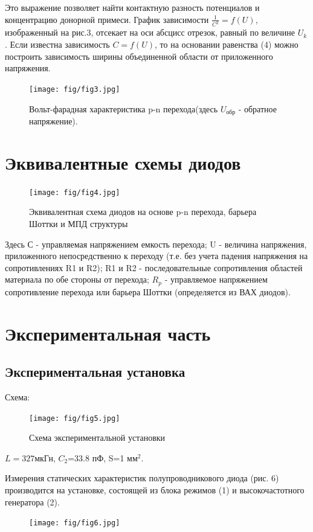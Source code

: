 Это выражение позволяет найти контактную разность потенциалов и концентрацию донорной примеси. График зависимости $\frac{1}{C^2}=f(U)$, изображенный на рис.3, отсекает на оси абсцисс отрезок, равный по величине $U_k$. Если известна зависимость $C=f(U)$, то на основании равенства (4) можно построить зависимость ширины объединенной области от приложенного напряжения.
\begin{figure}[h!]
	\centering
	\texttt{[image: fig/fig3.jpg]}
	\caption{Вольт-фарадная характеристика p-n перехода(здесь $U_{\text{обр}}$ - обратное напряжение).}
	\label{fig:3}
\end{figure}

\section{Эквивалентные схемы диодов}
\begin{figure}[h!]
	\centering
	\texttt{[image: fig/fig4.jpg]}
	\caption{Эквивалентная схема диодов на основе p-n перехода, барьера Шоттки и МПД структуры}
	\label{fig:4}
\end{figure}

Здесь С - управляемая напряжением емкость перехода; U - величина напряжения, приложенного непосредственно к переходу (т.е. без учета падения напряжения на сопротивлениях R1 и R2); R1 и R2 - последовательные сопротивления областей материала по обе стороны от перехода; $R_p$ - управляемое напряжением сопротивление перехода или барьера Шоттки (определяется из ВАХ диодов).

\section{Экспериментальная часть}
\subsection{Экспериментальная установка}
Схема:
\begin{figure}[h!]
	\centering
	\texttt{[image: fig/fig5.jpg]}
	\caption{Схема экспериментальной установки}
	\label{fig:5}
\end{figure}

$L=327\text{мкГн}$, $C_2$=33.8 пФ, S=1 мм$^2$.

Измерения статических характеристик полупроводникового диода (рис. 6) производится на установке, состоящей из блока режимов (1) и высокочастотного генератора (2).
\begin{figure}[h!]
	\centering
	\texttt{[image: fig/fig6.jpg]}
	\caption{}
	\label{fig:6}
\end{figure}

